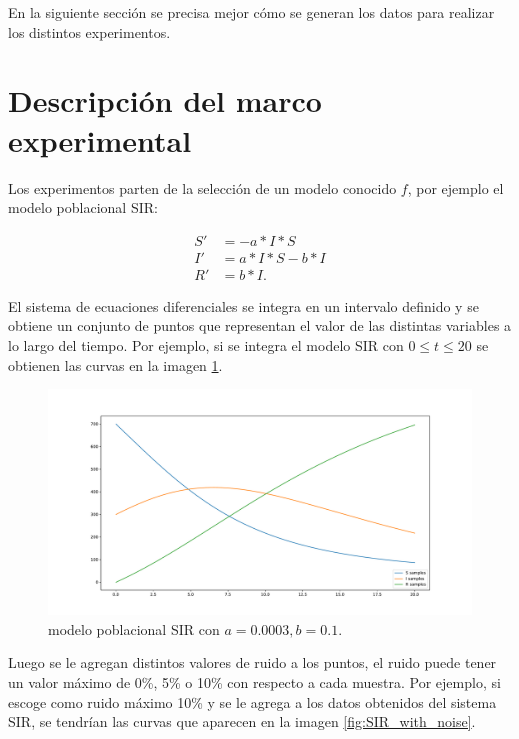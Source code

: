 En la siguiente sección se precisa mejor cómo se generan los datos para realizar los distintos experimentos.

\section{Descripción del marco experimental}

Los experimentos parten de la selección de un modelo conocido $f$, por ejemplo el modelo poblacional SIR:

\begin{align*}
    S' & = - a*I*S     \\
    I' & = a*I*S - b*I \\
    R' & = b*I.
\end{align*}

El sistema de ecuaciones diferenciales se integra en un intervalo definido y se obtiene un conjunto de puntos que representan el valor de las distintas variables a lo largo del tiempo. Por ejemplo, si se integra el modelo SIR con $0 \leq t \leq 20$ se obtienen las curvas en la imagen \ref{fig:SIR}.

\begin{figure}[h]
    \centering
    \includegraphics[width=\textwidth]{"figures/SIR.pdf"}
    \caption{modelo poblacional SIR con $a = 0.0003, b = 0.1$.}
    \label{fig:SIR}
\end{figure}

Luego se le agregan distintos valores de ruido a los puntos, el ruido puede tener un valor máximo de 0\%, 5\% o 10\% con respecto a cada muestra. Por ejemplo, si escoge como ruido máximo 10\% y se le agrega a los datos obtenidos del sistema SIR, se tendrían las curvas que aparecen en la imagen \ref{fig:SIR_with_noise}.

